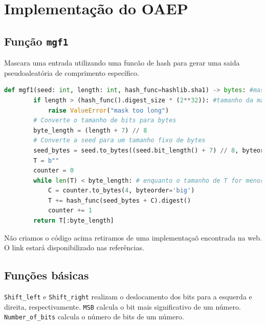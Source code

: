 \documentclass{article}
\begin{document}
\section{Implementação do OAEP}

\subsection{Função \texttt{mgf1}}
Mascara uma entrada utilizando uma funcão de hash para gerar uma saida pseudoaleatória de comprimento específico.

\begin{lstlisting}[language=Python]
    def mgf1(seed: int, length: int, hash_func=hashlib.sha1) -> bytes: #mascara de geracao de funcao
        if length > (hash_func().digest_size * (2**32)): #tamanho da mascara 
            raise ValueError("mask too long")
        # Converte o tamanho de bits para bytes
        byte_length = (length + 7) // 8
        # Converte a seed para um tamanho fixo de bytes
        seed_bytes = seed.to_bytes((seed.bit_length() + 7) // 8, byteorder='big')
        T = b""
        counter = 0
        while len(T) < byte_length: # enquanto o tamanho de T for menor que o tamanho de bytes
            C = counter.to_bytes(4, byteorder='big')
            T += hash_func(seed_bytes + C).digest()
            counter += 1
        return T[:byte_length]
    \end{lstlisting}

Não criamos o código acima retiramos de uma implementaçaõ encontrada na web.
O link estará disponibilizado nas referências.

\vspace{7 cm}
\subsection{Funções básicas}

\texttt{Shift\_left} e \texttt{Shift\_right} realizam o deslocamento dos bits para a esquerda e direita, respectivamente.
\texttt{MSB} calcula o bit mais significativo de um número. \texttt{Number\_of\_bits} calcula o número de bits de um número.
\end{document}
